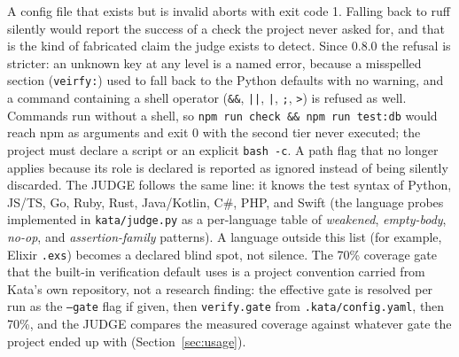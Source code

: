 \documentclass{sbc2019}%
\begin{document}
A config file that exists but is invalid aborts with exit code 1. Falling
back to ruff silently would report the success of a check the project
never asked for, and that is the kind of fabricated claim the judge
exists to detect. Since 0.8.0 the refusal is stricter: an unknown key at
any level is a named error, because a misspelled section
(\texttt{veirfy:}) used to fall back to the Python defaults with no
warning, and a command containing a shell operator (\texttt{\&\&},
\texttt{||}, \texttt{|}, \texttt{;}, \texttt{>}) is refused as well.
Commands run without a shell, so \texttt{npm run check \&\& npm run test:db}
would reach npm as arguments and exit 0 with the second tier never
executed; the project must declare a script or an explicit
\texttt{bash -c}. A path flag that no longer applies because its role is
declared is reported as ignored instead of being silently discarded.
The
JUDGE follows the same line: it knows the test syntax of Python, JS/TS,
Go, Ruby, Rust, Java/Kotlin, C\#, PHP, and Swift (the language probes
implemented in \texttt{kata/judge.py} as a per-language table of
\emph{weakened}, \emph{empty-body}, \emph{no-op}, and
\emph{assertion-family} patterns). A language outside this
list (for example, Elixir \texttt{.exs}) becomes a declared blind spot,
not silence. The 70\% coverage gate that the built-in verification default
uses is a project convention carried from Kata's own repository, not a
research finding: the effective gate is resolved per run as the
\texttt{--gate} flag if given, then \texttt{verify.gate} from
\texttt{.kata/config.yaml}, then 70\%,
and the JUDGE compares the measured coverage against whatever gate the
project ended up with (Section~\ref{sec:usage}).
\end{document}
